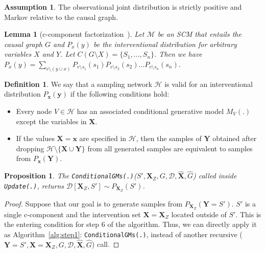 \documentclass{article}
\newcommand{\red}{\textcolor{red}}
\newcommand{\mk}[1]{{\color{red} MK: \{#1\}}}
\newcommand{\h}{\mathcal{H}}
\newcommand{\x}{\mathbf{x}}
\newcommand{\y}{\mathbf{y}}
\newcommand{\X}{\mathbf{X}}
\newcommand{\Xp}{{\hat{\mathbf{X}}}}
\newcommand{\Gp}{{\hat{{G}}}}
\newcommand{\Y}{\mathbf{Y}}
\newcommand{\mbf}{\mathbf}
\newcommand{\data}{\mathcal{D}}
\newcommand{\idgen}{\text{ID-GEN}\xspace}
\newcommand{\condgm}{\texttt{ConditionalGMs(.)}\xspace}
\newcommand{\stepsev}{\texttt{Update(.)}\xspace}
\theoremstyle{plain}
\newtheorem{proposition}[theorem]{Proposition}
\newtheorem{lemma}[theorem]{Lemma}
\theoremstyle{definition}
\newtheorem{definition}[theorem]{Definition}
\newtheorem{assumption}[theorem]{Assumption}
\theoremstyle{remark}
\begin{document}
\begin{assumption}
	\label{assum:strict-pos}
	The observational joint distribution is strictly positive
 and Markov relative to the causal graph.
\end{assumption}



\begin{lemma}[c-component factorization~\citep{tian2002general}]
	\label{bglemma:c-factorization}
	Let $\mathcal{M}$ be an SCM that entails
	the causal graph $G$ and $P_{x}(y)$ be the interventional distribution for arbitrary variables $X$ and $Y$.
	Let $C(G\setminus X) = \{S_1, \hdots , S_n\}$. Then we have 
	$ P_{x}(y) = \sum\limits_{v\setminus(y\cup x)} 
	P_{v\setminus s_1}(s_1)  P_{v\setminus s_2}(s_2)  \hdots P_{v\setminus s_n}(s_n).$
\end{lemma}


\begin{definition}
	We say that a sampling network $\mathcal{H}$ is valid for an  interventional distribution $P_{\x}(\y)$ if the following conditions hold:
	\begin{itemize}
		\item Every node $V \in \h$ has an associated conditional generative model $M_V(.)$ except the variables in $\mbf{X}$.
		\item If the values $\X=\x$ are specified in $\h$, %
		then the samples of $\Y$ obtained after dropping $\h\setminus \{\X \cup \Y\}$ from all generated samples
		are equivalent to samples from $P_\x(\Y)$.
	\end{itemize}
\end{definition}


% 



\begin{proposition}
The  \condgm($S', \mbf{X}_Z,
				G, 
				\data,
				{\Xp},
				\Gp$)   called inside \stepsev, returns $\data[\X_Z, S']\sim P_{\X_Z}(S')$.
\end{proposition}
\begin{proof}
Suppose that our goal is to generate samples from $P_{\X_Z}(\Y= S')$.
$S'$ is a single c-component and the intervention set $\X=\X_Z$ located outside of $S'$. This is the entering condition for step 6 of the \idgen algorithm.
Thus, we can directly apply it as Algorithm~\ref{alg:step1}: \condgm, instead of another recursive \idgen($\Y=S', \X=\X_Z, G, \data, \Xp, \Gp$) call.
\end{proof}
\end{document}
